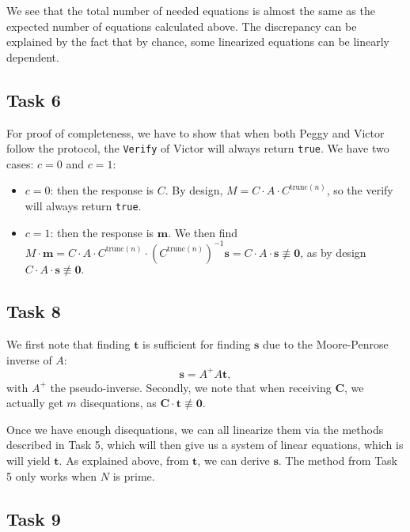 \documentclass{article}
\begin{document}
We see that the total number of needed equations is almost the same as the
expected number of equations calculated above. The discrepancy can be explained
by the fact that by chance, some linearized equations can be linearly dependent.

\subsection*{Task 6}

For proof of completeness, we have to show that when both Peggy and Victor
follow the protocol, the \texttt{Verify} of Victor will always return
\texttt{true}. We have two cases: $c = 0$ and $c = 1$: 
 \begin{itemize}
   \item $c = 0$: then the response is $C$. By design, $M = C \cdot A \cdot
     C^{\text{trunc}(n)}$, so the verify will always return  \texttt{true}.
   \item $c = 1$: then the response is $\mathbf{m}$. We then find $M
     \cdot\mathbf{m} = C \cdot A \cdot C^{\text{trunc}(n)} \cdot \left(
     C^{\text{trunc}(n)} \right)^{-1} \mathbf{s} = C \cdot A \cdot \mathbf{s}
     \not\equiv \mathbf{0}$, as by design $C \cdot A \cdot \mathbf{s} \not\equiv
     \mathbf{0}.$
\end{itemize}

\subsection*{Task 8}

We first note that finding $\mathbf{t}$ is sufficient for finding $\mathbf{s}$
due to the Moore-Penrose inverse of $A$: 
\begin{equation}
  \mathbf{s} = A^+ A \mathbf{t},
\end{equation} 
with $A^+$ the pseudo-inverse. Secondly, we note that when receiving
$\mathbf{C}$, we actually get $m$ disequations, as $\mathbf{C} \cdot \mathbf{t}
\not\equiv \mathbf{0}$. 

Once we have enough disequations, we can all linearize them via the methods
described in Task 5, which will then give us a system of linear equations, which
is will yield $\mathbf{t}.$ As explained above, from  $\mathbf{t}$, we can
derive $\mathbf{s}$. The method from Task 5 only works when $N$ is prime.

\subsection*{Task 9}
\end{document}

